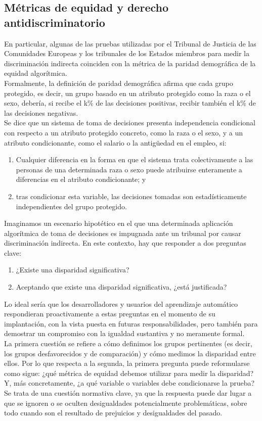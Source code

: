 \subsection{Métricas de equidad y derecho antidiscriminatorio}
En particular, algunas de las pruebas utilizadas por el Tribunal de Justicia de las Comunidades Europeas y los tribunales de los Estados miembros para medir la discriminación indirecta coinciden con la métrica de la paridad demográfica de la equidad algorítmica.\\
Formalmente, la definición de paridad demográfica afirma que cada grupo protegido, es decir, un grupo basado en un atributo protegido como la raza o el sexo, debería, si recibe el k\% de las decisiones positivas, recibir también el k\% de las decisiones negativas.\\

Se dice que un sistema de toma de decisiones presenta independencia condicional con respecto a un atributo protegido concreto, como la raza o el sexo, y a un atributo condicionante, como el salario o la antigüedad en el empleo, si:

\begin{enumerate}[1.]
    \item Cualquier diferencia en la forma en que el sistema trata colectivamente a las personas de una determinada raza o sexo puede atribuirse enteramente a diferencias en el atributo condicionante; y 
    \item tras condicionar esta variable, las decisiones tomadas son estadísticamente independientes del grupo protegido.
\end{enumerate}

Imaginamos un escenario hipotético en el que una determinada aplicación algorítmica de toma de decisiones es impugnada ante un tribunal por causar discriminación indirecta. En este contexto, hay que responder a dos preguntas clave: 

\begin{enumerate}[1.]
	\item ¿Existe una disparidad significativa? 
	\item Aceptando que existe una disparidad significativa, ¿está justificada?
\end{enumerate}

Lo ideal sería que los desarrolladores y usuarios del aprendizaje automático respondieran proactivamente a estas preguntas en el momento de su implantación, con la vista puesta en futuras responsabilidades, pero también para demostrar un compromiso con la igualdad sustantiva y no meramente formal.\\
La primera cuestión se refiere a cómo definimos los grupos pertinentes (es decir, los grupos desfavorecidos y de comparación) y cómo medimos la disparidad entre ellos. Por lo que respecta a la segunda, la primera pregunta puede reformularse como sigue: ¿qué métrica de equidad debemos utilizar para medir la disparidad? Y, más concretamente, ¿a qué variable o variables debe condicionarse la prueba? Se trata de una cuestión normativa clave, ya que la respuesta puede dar lugar a que se ignoren o se oculten desigualdades potencialmente problemáticas, sobre todo cuando son el resultado de prejuicios y desigualdades del pasado.

